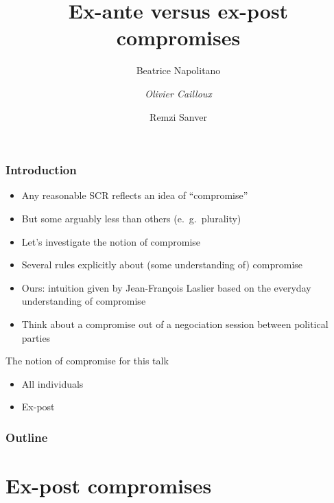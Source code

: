 \documentclass[french, english]{beamer}
\title{Ex-ante versus ex-post compromises}
\author[B.\ Napolitano, \emph{Olivier Cailloux}, R.\ Sanver]{Beatrice Napolitano \and \emph{Olivier Cailloux} \and Remzi Sanver}
\institute[LAMSADE]{LAMSADE, Université Paris-Dauphine}
\date{\formatdate{24}{11}{2020}}
\begin{document}
\begin{frame}[plain]
	\titlepage
\end{frame}
\addtocounter{framenumber}{-1}

\begin{frame}
	\frametitle{Introduction}
		\begin{itemize}
			\item Any reasonable \ac{SCR} reflects an idea of “compromise”
			\item But some arguably less than others (e.\ g.\ plurality)
			\item Let’s investigate the notion of compromise
			\item Several rules explicitly about (some understanding of) compromise
			\item Ours: intuition given by Jean-François Laslier based on the everyday understanding of compromise
			\item Think about a compromise out of a negociation session between political parties
		\end{itemize}
	\begin{block}{The notion of compromise for this talk}
		\begin{itemize}
			\item All individuals
			\item Ex-post
		\end{itemize}
	\end{block}
\end{frame}

\begin{frame}
	\frametitle{Outline}
	\tableofcontents[hideallsubsections, sectionstyle=shaded/show]
\end{frame}


\section{Ex-post compromises}
\end{document}
